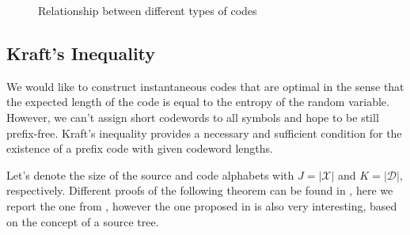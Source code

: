 \begin{figure}[h]
    \centering
    \caption{Relationship between different types of codes \label{fig:codes}}
\end{figure}

\subsection{Kraft's Inequality}

We would like to construct instantaneous codes that are optimal in the sense that the expected length of the code is equal to the entropy of the random variable. However, we can't assign short codewords to all symbols and hope to be still prefix-free. Kraft's inequality provides a necessary and sufficient condition for the existence of a prefix code with given codeword lengths.
\vspace{0.4cm}

\noindent Let's denote the size of the source and code alphabets with $J = |\mathcal{X}|$ and $K = |\mathcal{D}|$, respectively. Different proofs of the following theorem can be found in \cite{ElementsofInformationTheory,han2002mathematics}, here we report the one from \cite{han2002mathematics}, however the one proposed in \cite{ElementsofInformationTheory} is also very interesting, based on the concept of a source tree.

